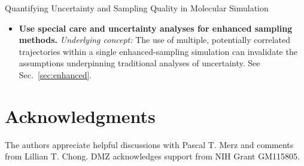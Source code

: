 \documentclass[9pt,bestpractices]{livecoms}
\begin{document}
\begin{Checklists*}[p!]
\begin{checklist}{Quantifying Uncertainty and Sampling Quality in Molecular Simulation}
\begin{itemize}
\item
\textbf{Use special care and uncertainty analyses for enhanced sampling methods.}  \emph{Underlying concept:} The use of multiple, potentially correlated trajectories within a single enhanced-sampling simulation can invalidate the assumptions underpinning traditional analyses of uncertainty.  See Sec.\ \ref{sec:enhanced}.
\end{itemize}
\end{checklist}
\end{Checklists*}










\section{Acknowledgments}
The authors appreciate helpful discussions with Pascal T. Merz and comments from Lillian T. Chong.
DMZ acknowledges support from NIH Grant GM115805.



%
\end{document}
